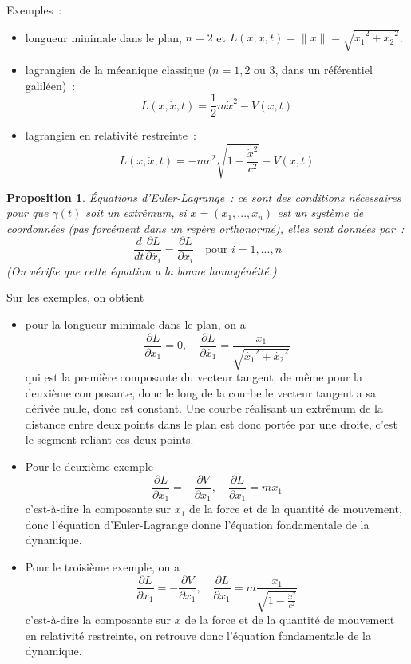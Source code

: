 \documentclass[a4paper,11pt]{article}
\newtheorem{prop}[thm]{Proposition}
\begin{document}
Exemples~: 
\begin{itemize}
\item
longueur minimale dans le plan, $n=2$ et 
$L(x,\dot{x},t)=\| \dot{x} \|=\sqrt{\dot{x_1}^2+\dot{x_2}^2}$.
\item lagrangien de la m\'ecanique classique ($n=1,2$ ou 3, dans un
  r\'ef\'erentiel galil\'een)~:
$$L(x,\dot{x},t)=\frac12m\dot{x}^2-V(x,t)$$
\item lagrangien en relativit\'e restreinte~:
$$ L(x,\dot{x},t)=-mc^2\sqrt{1-\frac{\dot{x}^2}{c^2}}-V(x,t)$$
\end{itemize}

\begin{prop}
\'Equations d'Euler-Lagrange~: 
ce sont des conditions n\'ecessaires
pour que $\gamma(t)$ soit un extr\^emum, si
$x=(x_1,...,x_n)$ est un syst\`eme de coordonn\'ees (pas
forc\'ement dans un rep\`ere orthonorm\'e),
elles sont donn\'ees par~:
$$ \frac{d}{dt} \frac{\partial L}{\partial \dot{x_i}} = 
\frac{\partial L}{\partial x_i} \quad \mbox{pour } i=1,...,n$$
(On v\'erifie que cette \'equation a la bonne homog\'en\'eit\'e.)
\end{prop}

Sur les exemples, on obtient
\begin{itemize}
\item pour la longueur minimale dans le plan, on a 
$$\frac{\partial L}{\partial x_1}=0, \quad
\frac{\partial L} {\partial \dot{x_1}}=\frac{\dot{x_1}} {\sqrt{\dot{x_1}^2+\dot{x_2}^2}}
$$
qui est la premi\`ere composante du vecteur tangent,
de m\^eme pour la deuxi\`eme composante, 
donc le long de la courbe le vecteur tangent a sa d\'eriv\'ee
nulle, donc est constant. Une
courbe r\'ealisant un extr\^emum de la distance entre deux points
dans le plan est donc port\'ee par une droite, c'est le segment
reliant ces deux points.
\item Pour le deuxi\`eme exemple
$$ \frac{\partial L}{\partial x_1}=-\frac{\partial V}{\partial x_1},
\quad \frac{\partial L}{\partial x_1}=m\dot{x_1}
$$
c'est-\`a-dire la composante sur $x_1$ de la force et
de la quantit\'e de mouvement, donc l'\'equation d'Euler-Lagrange
donne l'\'equation fondamentale de la dynamique.
\item
Pour le troisi\`eme exemple, on a
$$ \frac{\partial L}{\partial x_1}=-\frac{\partial V}{\partial x_1},
\quad \frac{\partial L}{\partial x_1}=m\frac{\dot{x_1}}{\sqrt{1- 
\frac{\dot{x}^2}{c^2}}}
$$
c'est-\`a-dire la composante sur $x$ de la force et
de la quantit\'e de mouvement en relativit\'e restreinte,
on retrouve donc l'\'equation fondamentale de la dynamique.
\end{itemize}
\end{document}
